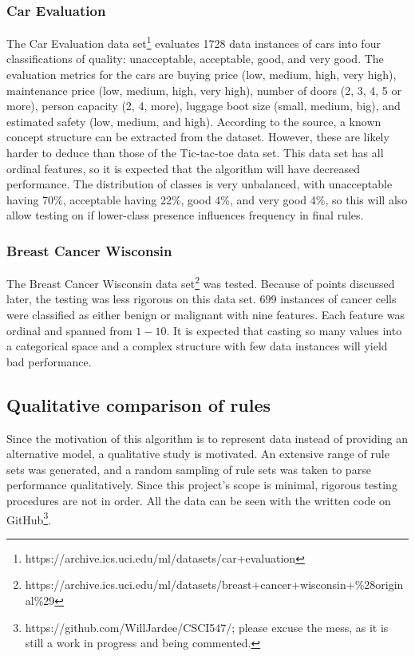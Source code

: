 \documentclass[10pt]{article}
\begin{document}
\subsubsection{Car Evaluation}
The Car Evaluation data set\footnote{https://archive.ics.uci.edu/ml/datasets/car+evaluation} evaluates 1728 data instances of cars into four classifications of quality: unacceptable, acceptable, good, and very good. The evaluation metrics for the cars are buying price (low, medium, high, very high), maintenance price (low, medium, high, very high), number of doors (2, 3, 4, 5 or more), person capacity (2, 4, more), luggage boot size (small, medium, big), and estimated safety (low, medium, and high). According to the source, a known concept structure can be extracted from the dataset. However, these are likely harder to deduce than those of the Tic-tac-toe data set. This data set has all ordinal features, so it is expected that the algorithm will have decreased performance. The distribution of classes is very unbalanced, with unacceptable having 70\%, acceptable having 22\%, good 4\%, and very good 4\%, so this will also allow testing on if lower-class presence influences frequency in final rules. 

\subsubsection{Breast Cancer Wisconsin}
The Breast Cancer Wisconsin data set\footnote{https://archive.ics.uci.edu/ml/datasets/breast+cancer+wisconsin+\%28original\%29} was tested. Because of points discussed later, the testing was less rigorous on this data set. 699 instances of cancer cells were classified as either benign or malignant with nine features. Each feature was ordinal and spanned from $1-10$. It is expected that casting so many values into a categorical space and a complex structure with few data instances will yield bad performance.

\subsection{Qualitative comparison of rules}
Since the motivation of this algorithm is to represent data instead of providing an alternative model, a qualitative study is motivated. An extensive range of rule sets was generated, and a random sampling of rule sets was taken to parse performance qualitatively. Since this project's scope is minimal, rigorous testing procedures are not in order. All the data can be seen with the written code on GitHub\footnote{https://github.com/WillJardee/CSCI547/; please excuse the mess, as it is still a work in progress and being commented.}. 
\end{document}
